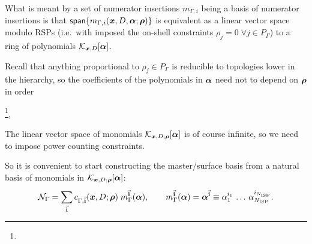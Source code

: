 What is meant by a set of numerator insertions $m_{\Gamma,i}$ being a basis of numerator insertions is that
$\mathsf{span}\{m_{\Gamma,i}(\vb*{x},D,\vb*{\alpha};\vb*{\rho})\}$ is equivalent as a linear vector space
modulo RSPs (i.e.\ with imposed the on-shell constraints $\rho_j = 0\;\forall j\in P_\Gamma$)
to a ring of polynomials $\mathcal{K}_{\vb*{x},D}[\vb*{\alpha}]$.

Recall that anything proportional to $\rho_j \in P_\Gamma$ is reducible to topologies lower in the hierarchy,
so the coefficients of the polynomials in $\vb*{\alpha}$ need not to depend on $\vb*{\rho}$ in order

\footnote{
}, 

The linear vector space of monomials $\mathcal{K}_{\vb*{x},D;\vb*{\rho}}[\vb*{\alpha}]$ is of course infinite,
so we need to impose power counting constraints.



So it is convenient to start constructing the master/surface basis from a natural basis of monomials in $\mathcal{K}_{\vb*{x},D;\vb*{\rho}}[\vb*{\alpha}]$:
\begin{equation}
  \mathcal{N}_\Gamma = \sum_{\va{i}}^{} c_{\Gamma, \va{i}}(\vb*{x},D;\vb*{\rho}) \; m_\Gamma^{\va{i}}(\vb*{\alpha}), \qquad
  m_\Gamma^{\va{i}}(\vb*{\alpha}) = \vb*{\alpha}^{\va{i}} \equiv 
  \alpha_1^{i_1}\,\ldots{}\,\alpha_{N_\text{ISP} }^{i_{N_\text{ISP} }}.
\end{equation}






